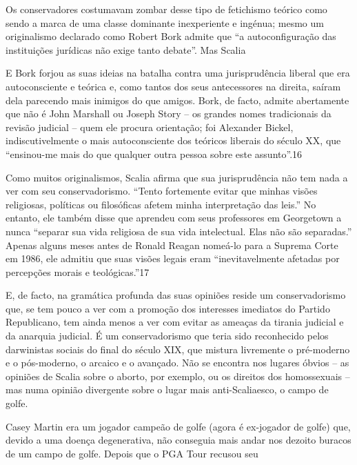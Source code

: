  \par 
Os conservadores costumavam zombar desse tipo de fetichismo teórico como sendo a marca de uma classe dominante inexperiente e ingénua; mesmo um originalismo declarado como Robert Bork admite que “a autoconfiguração das instituições jurídicas não exige tanto debate”. Mas Scalia
 \par 
E Bork forjou as suas ideias na batalha contra uma jurisprudência liberal que era autoconsciente e teórica e, como tantos dos seus antecessores na direita, saíram dela parecendo mais inimigos do que amigos. Bork, de facto, admite abertamente que não é John Marshall ou Joseph Story – os grandes nomes tradicionais da revisão judicial – quem ele procura orientação; foi Alexander Bickel, indiscutivelmente o mais autoconsciente dos teóricos liberais do século XX, que “ensinou-me mais do que qualquer outra pessoa sobre este assunto”.{\color{blue}16}
 \par 
Como muitos originalismos, Scalia afirma que sua jurisprudência não tem nada a ver com seu conservadorismo. “Tento fortemente evitar que minhas visões religiosas, políticas ou filosóficas afetem minha interpretação das leis.” No entanto, ele também disse que aprendeu com seus professores em Georgetown a nunca “separar sua vida religiosa de sua vida intelectual. Elas não são separadas.” Apenas alguns meses antes de Ronald Reagan nomeá-lo para a Suprema Corte em 1986, ele admitiu que suas visões legais eram “inevitavelmente afetadas por percepções morais e teológicas.”{\color{blue}17}
 \par 
E, de facto, na gramática profunda das suas opiniões reside um conservadorismo que, se tem pouco a ver com a promoção dos interesses imediatos do Partido Republicano, tem ainda menos a ver com evitar as ameaças da tirania judicial e da anarquia judicial. É um conservadorismo que teria sido reconhecido pelos darwinistas sociais do final do século XIX, que mistura livremente o pré-moderno e o pós-moderno, o arcaico e o avançado. Não se encontra nos lugares óbvios – as opiniões de Scalia sobre o aborto, por exemplo, ou os direitos dos homossexuais – mas numa opinião divergente sobre o lugar mais anti-Scaliaesco, o campo de golfe.
 \par 
Casey Martin era um jogador campeão de golfe (agora é ex-jogador de golfe) que, devido a uma doença degenerativa, não conseguia mais andar nos dezoito buracos de um campo de golfe. Depois que o PGA Tour recusou seu
 \par 
